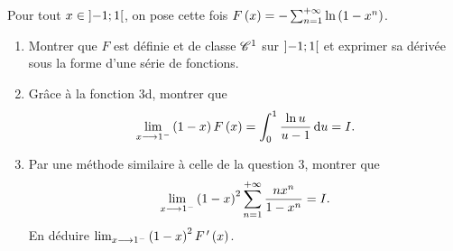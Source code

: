 \begin{q}
Pour tout \(x\in\left]-1;1\right[\), on pose cette fois \(F\left(x\right)=-\sum_{n=1}^{+\infty}\ln\left(1-x^n\right)\).

\begin{enumerate}
    \item Montrer que \(F\) est définie et de classe \(\mathscr{C}^{1}\) sur \(\left]-1;1\right[\) et exprimer sa dérivée sous la forme d'une série de fonctions. \\
    \item Grâce à la fonction 3d, montrer que \[\lim_{x\to1^-}\paren{1-x}F\paren{x}=\int_0^1\dfrac{\ln u}{u-1}\odif{u}=I.\]
    \item Par une méthode similaire à celle de la question 3, montrer que \[\lim_{x\longrightarrow1^-}\left(1-x\right)^2\sum_{n=1}^{+\infty}\dfrac{nx^n}{1-x^n}=I.\] En déduire \(\lim_{x\longrightarrow1^-}\left(1-x\right)^2F^{\,\prime}\left(x\right)\).
\end{enumerate}
\end{q}
